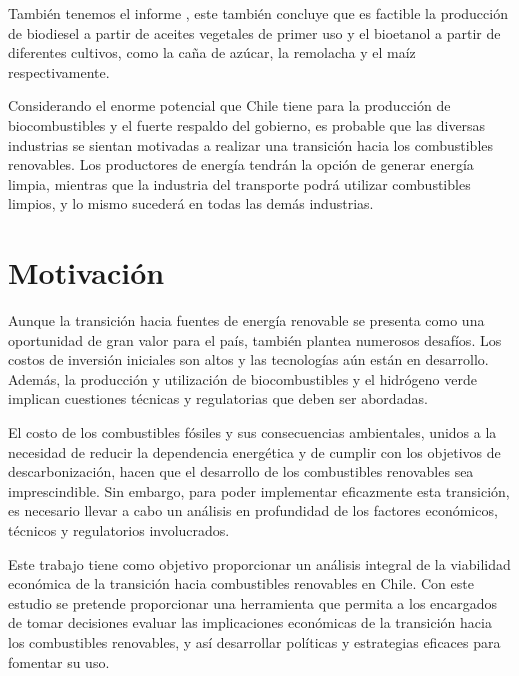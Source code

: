  También tenemos el informe , este también concluye que es factible la producción de biodiesel  a partir de aceites vegetales de primer uso y el bioetanol a partir de diferentes cultivos, como la caña de azúcar, la remolacha y el maíz respectivamente.
\vspace{2.5mm}


Considerando el enorme potencial que Chile tiene para la producción de biocombustibles y el fuerte respaldo del gobierno, es probable que las diversas industrias se sientan motivadas a realizar una transición hacia los combustibles renovables. Los productores de energía tendrán la opción de generar energía limpia, mientras que la industria del transporte podrá utilizar combustibles limpios, y lo mismo sucederá en todas las demás industrias.
\vspace{2.5mm}

\section{Motivación}
Aunque la transición hacia fuentes de energía renovable se presenta como una oportunidad de gran valor para el país, también plantea numerosos desafíos. Los costos de inversión iniciales son altos y las tecnologías aún están en desarrollo. Además, la producción y utilización de biocombustibles y el hidrógeno verde implican cuestiones técnicas y regulatorias que deben ser abordadas.
\vspace{2.5mm}

El costo de los combustibles fósiles y sus consecuencias ambientales, unidos a la necesidad de reducir la dependencia energética y de cumplir con los objetivos de descarbonización, hacen que el desarrollo de los combustibles renovables sea imprescindible. Sin embargo, para poder implementar eficazmente esta transición, es necesario llevar a cabo un análisis en profundidad de los factores económicos, técnicos y regulatorios involucrados.
\vspace{2.5mm}

Este trabajo tiene como objetivo proporcionar un análisis integral de la viabilidad económica de la transición hacia combustibles renovables en Chile. Con este estudio se pretende proporcionar una herramienta que permita a los encargados de tomar decisiones evaluar las implicaciones económicas de la transición hacia los combustibles renovables, y así desarrollar políticas y estrategias eficaces para fomentar su uso.
\vspace{2.5mm}

